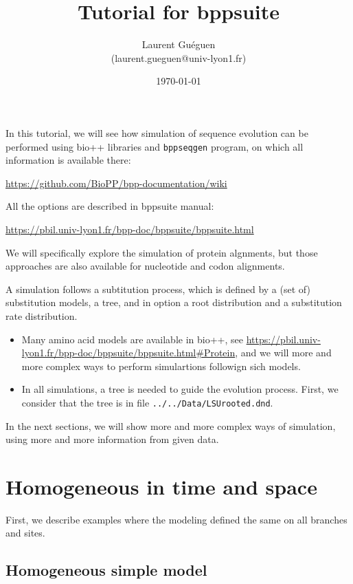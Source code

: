 \documentclass{article}
\title{Tutorial for bppsuite}
\date{\today}
\author{Laurent Guéguen \\ {\small (laurent.gueguen@univ-lyon1.fr)}}
\begin{document}
\maketitle
\thispagestyle{empty}

\medskip 


In this tutorial, we will see how simulation of sequence evolution can
be performed using bio++ libraries and \texttt{bppseqgen} program, on
which all information is available there:

\url{https://github.com/BioPP/bpp-documentation/wiki}

\medskip

All the options are described in bppsuite manual:

\url{https://pbil.univ-lyon1.fr/bpp-doc/bppsuite/bppsuite.html}

We will specifically explore the simulation of protein algnments, but
those approaches are also available for nucleotide and codon
alignments.

A simulation follows a subtitution process, which is defined by
a (set of) substitution models, a tree, and in option a root
distribution and a substitution rate distribution.

\begin{itemize}
\item
  Many amino acid models are available in bio++, see
  \url{https://pbil.univ-lyon1.fr/bpp-doc/bppsuite/bppsuite.html#Protein},
  and we will more and more complex ways to perform simulartions
  followign sich models.

\item In all simulations, a tree is needed to guide the evolution
  process. First, we consider that the tree is in file
  \texttt{../../Data/LSUrooted.dnd}.

  
\end{itemize}

In the next sections, we will show more and more complex ways of
simulation, using more and more information from given data.


\section{Homogeneous in time and space}

First, we describe examples where the modeling defined the same on all
branches and sites.

\subsection{Homogeneous simple model}
\end{document}
